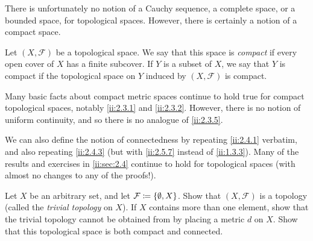 \begin{note}
  There is unfortunately no notion of a Cauchy sequence, a complete space, or a bounded space, for topological spaces.
  However, there is certainly a notion of a compact space.
\end{note}

\begin{defn}\label{ii:2.5.9}
  Let \((X, \mathcal{F})\) be a topological space.
  We say that this space is \emph{compact} if every open cover of \(X\) has a finite subcover.
  If \(Y\) is a subset of \(X\), we say that \(Y\) is compact if the topological space on \(Y\) induced by \((X, \mathcal{F})\) is compact.
\end{defn}

\begin{note}
  Many basic facts about compact metric spaces continue to hold true for compact topological spaces, notably \cref{ii:2.3.1} and \cref{ii:2.3.2}.
  However, there is no notion of uniform continuity, and so there is no analogue of \cref{ii:2.3.5}.
\end{note}

\begin{note}
  We can also define the notion of connectedness by repeating \cref{ii:2.4.1} verbatim, and also repeating \cref{ii:2.4.3} (but with \cref{ii:2.5.7} instead of \cref{ii:1.3.3}).
  Many of the results and exercises in \cref{ii:sec:2.4} continue to hold for topological spaces
  (with almost no changes to any of the proofs!).
\end{note}

\exercisesection

\begin{ex}\label{ii:ex:2.5.1}
  Let \(X\) be an arbitrary set, and let \(\mathcal{F} \coloneqq \left\lbrace\emptyset, X\right\rbrace\).
  Show that \((X, \mathcal{F})\) is a topology
  (called the \emph{trivial topology} on \(X\)).
  If \(X\) contains more than one element, show that the trivial topology cannot be obtained from by placing a metric \(d\) on \(X\).
  Show that this topological space is both compact and connected.
\end{ex}

